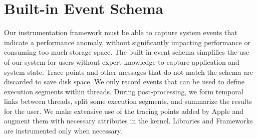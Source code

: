 \section{Built-in Event Schema}\label{section: builtin_event_schema}
Our instrumentation framework must be able to capture system events that indicate a performance anomaly, without significantly impacting performance or consuming too much storage space.
The built-in event schema simplifies the use of our system for users without expert knowledge to capture application and system state.
Trace points and other messages that do not match the schema are discarded to save disk space.
We only record events that can be used to define execution segments within threads.
During post-processing, we form temporal links between threads, split some execution segments, and summarize the results for the user.
We make extensive use of the tracing points added by Apple and augment them with necessary attributes in the kernel.
Libraries and Frameworks are instrumented only when necessary.

